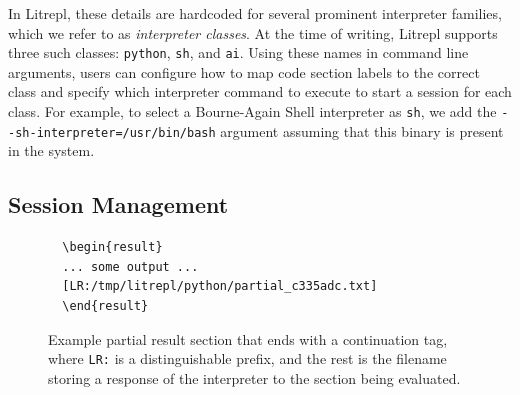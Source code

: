 \documentclass[letterpaper,12pt,twocolumn]{article}
\begin{document}
In Litrepl, these details are hardcoded for several prominent interpreter
families, which we refer to as \textit{interpreter classes}. At the time of
writing, Litrepl supports three such classes: \texttt{python}, \texttt{sh}, and
\texttt{ai}. Using these names in command line arguments, users can configure
how to map code section labels to the correct class and specify which
interpreter command to execute to start a session for each class. For example,
to select a Bourne-Again Shell interpreter as \verb|sh|, we add the
\verb|--sh-interpreter=/usr/bin/bash| argument assuming that this binary is
present in the system.

\subsection{Session Management}

\begin{figure}[hbt!]
  \centering
  \begin{minipage}{\textwidth}
  \begin{verbatim}
  \begin{result}
  ... some output ...
  [LR:/tmp/litrepl/python/partial_c335adc.txt]
  \end{result}
  \end{verbatim}
  \end{minipage}
  \caption{Example partial result section that ends with a continuation tag,
  where \texttt{LR:} is a distinguishable prefix, and the rest is the filename
  storing a response of the interpreter to the section being evaluated.}
  \label{fig:partial-result}
\end{figure}
\end{document}

